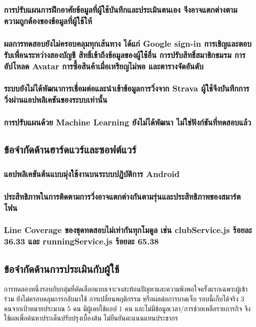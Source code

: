 \subsubsection{การปรับแผนการฝึกอาศัยข้อมูลที่ผู้ใช้บันทึกและประเมินตนเอง จึงอาจแตกต่างตามความถูกต้องของข้อมูลที่ผู้ใช้ให้}
\subsubsection{ผลการทดสอบยังไม่ครอบคลุมทุกเส้นทาง ได้แก่ Google sign-in การเชิญและตอบรับเพื่อนระหว่างสองบัญชี สิทธิ์เข้าถึงข้อมูลของผู้ใช้อื่น การปรับสิทธิ์สมาชิกชมรม การอัปโหลด Avatar การซื้อสินค้าเมื่อเหรียญไม่พอ และตารางจัดอันดับ}
\subsubsection{ระบบยังไม่ได้พัฒนาการเชื่อมต่อและนำเข้าข้อมูลการวิ่งจาก Strava ผู้ใช้จึงบันทึกการวิ่งผ่านแอปพลิเคชันของระบบเท่านั้น}
\subsubsection{การปรับแผนด้วย Machine Learning ยังไม่ได้พัฒนา ไม่ใช่ฟังก์ชันที่ทดสอบแล้ว}

\subsection{ข้อจำกัดด้านฮาร์ดแวร์และซอฟต์แวร์}
\subsubsection{แอปพลิเคชันต้นแบบมุ่งใช้งานบนระบบปฏิบัติการ Android}
\subsubsection{ประสิทธิภาพในการติดตามการวิ่งอาจแตกต่างกันตามรุ่นและประสิทธิภาพของสมาร์ตโฟน}
\subsubsection{Line Coverage ของชุดทดสอบไม่เท่ากันทุกโมดูล เช่น clubService.js ร้อยละ 36.33 และ runningService.js ร้อยละ 65.38}

\subsection{ข้อจำกัดด้านการประเมินกับผู้ใช้}

การทดลองหนึ่งรอบกับกลุ่มที่คัดเลือกแบบเจาะจงสะท้อนปัญหาและความพึงพอใจครั้งแรกเฉพาะผู้เข้าร่วม ยังไม่ครอบคลุมการกลับมาใช้ การเปลี่ยนพฤติกรรม หรือผลต่อการบาดเจ็บ รอบนี้เก็บได้จริง 3 คนจากเป้าหมายประมาณ 5 คน มีผู้เคยใช้แอป 1 คน และไม่มีข้อมูลเวลา/การช่วยเหลือรายภารกิจ จึงใช้ผลเพื่อค้นหาประเด็นปรับปรุงเบื้องต้น ไม่ยืนยันคะแนนแทนประชากร \cite{budiu2021five}


